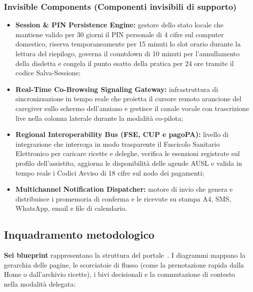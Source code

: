 \subsubsection{Invisible Components (Componenti invisibili di supporto)}
\begin{itemize}
\item \textbf{Session \& PIN Persistence Engine:} gestore dello stato locale che mantiene valido per 30 giorni il PIN personale di 4 cifre sul computer domestico, riserva temporaneamente per 15 minuti lo slot orario durante la lettura del riepilogo, governa il countdown di 10 minuti per l'annullamento della disdetta e congela il punto esatto della pratica per 24 ore tramite il codice Salva-Sessione;
\item \textbf{Real-Time Co-Browsing Signaling Gateway:} infrastruttura di sincronizzazione in tempo reale che proietta il cursore remoto arancione del caregiver sullo schermo dell'anziano e gestisce il canale vocale con trascrizione live nella colonna laterale durante la modalità co-pilota;
\item \textbf{Regional Interoperability Bus (FSE, CUP e pagoPA):} livello di integrazione che interroga in modo trasparente il Fascicolo Sanitario Elettronico per caricare ricette e deleghe, verifica le esenzioni registrate sul profilo dell'assistito, aggiorna le disponibilità delle agende AUSL e valida in tempo reale i Codici Avviso di 18 cifre sul nodo dei pagamenti;
\item \textbf{Multichannel Notification Dispatcher:} motore di invio che genera e distribuisce i promemoria di conferma e le ricevute su stampa A4, SMS, WhatsApp, email e file di calendario.
\end{itemize}

\label{doc:c:03}

\subsection{Inquadramento metodologico}

\textbf{Sei blueprint} rappresentano la struttura del portale~\cite{garrettElements2011,morvilleRosenfeld2006}. I diagrammi mappano la gerarchia delle pagine, le scorciatoie di flusso (come la prenotazione rapida dalla Home o dall'archivio ricette), i bivi decisionali e la commutazione di contesto nella modalità delegata:

